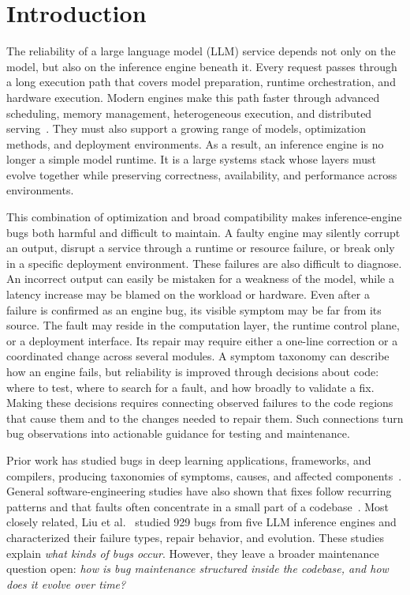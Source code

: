 \section{Introduction}
The reliability of a large language model (LLM) service depends not only on the model, but also on the inference engine beneath it. Every request passes through a long execution path that covers model preparation, runtime orchestration, and hardware execution. Modern engines make this path faster through advanced scheduling, memory management, heterogeneous execution, and distributed serving~\cite{yu2022orca,kwon2023pagedattention,aminabadi2022deepspeed,zheng2024sglang,zhong2024distserve,park2026inferenceengines}. They must also support a growing range of models, optimization methods, and deployment environments. As a result, an inference engine is no longer a simple model runtime. It is a large systems stack whose layers must evolve together while preserving correctness, availability, and performance across environments.

This combination of optimization and broad compatibility makes inference-engine bugs both harmful and difficult to maintain. A faulty engine may silently corrupt an output, disrupt a service through a runtime or resource failure, or break only in a specific deployment environment. These failures are also difficult to diagnose. An incorrect output can easily be mistaken for a weakness of the model, while a latency increase may be blamed on the workload or hardware. Even after a failure is confirmed as an engine bug, its visible symptom may be far from its source. The fault may reside in the computation layer, the runtime control plane, or a deployment interface. Its repair may require either a one-line correction or a coordinated change across several modules. A symptom taxonomy can describe how an engine fails, but reliability is improved through decisions about code: where to test, where to search for a fault, and how broadly to validate a fix. Making these decisions requires connecting observed failures to the code regions that cause them and to the changes needed to repair them. Such connections turn bug observations into actionable guidance for testing and maintenance.

Prior work has studied bugs in deep learning applications, frameworks, and compilers, producing taxonomies of symptoms, causes, and affected components~\cite{islam2019bugs,humbatova2020taxonomy,yang2022frameworkbugs,chen2023frameworkbugs,shen2021compilerbugs,du2021compilerbugs}. General software-engineering studies have also shown that fixes follow recurring patterns and that faults often concentrate in a small part of a codebase~\cite{pan2009bugfixpatterns,sobreira2018dissection,liu2020vulnerabilitydistribution}. Most closely related, Liu et al.~\cite{liu2026firstlook} studied 929 bugs from five LLM inference engines and characterized their failure types, repair behavior, and evolution. These studies explain \emph{what kinds of bugs occur}. However, they leave a broader maintenance question open: \emph{how is bug maintenance structured inside the codebase, and how does it evolve over time?}

